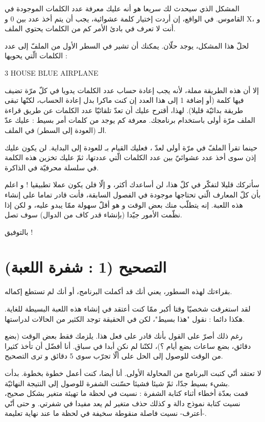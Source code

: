 المشكل الذي سيحدث لك سريعا هو أنه عليك معرفة عدد الكلمات الموجودة في القاموس. في الواقع، إن أردت إختيار كلمة عشوائية، يجب أن يتم أخذ عدد بين 0 و
\textenglish{X}،
و أنت لا تعرف في بادئ الأمر كم من الكلمات يحتوي الملف.

لحلّ هذا المشكل، يوجد حلّان. يمكنك أن تشير في السطر الأول من الملفّ إلى عدد الكلمات الّتي يحويها :

\begin{Console}
3
HOUSE
BLUE
AIRPLANE
\end{Console}

إلا أن هذه الطريقة مملة، لأنه يجب إعادة حساب عدد الكلمات يدويا في كلّ مرّة تضيف فيها كلمة (أو إضافة 1 إلى هذا العدد إن كنت ماكرا بدل إعادة الحساب، لكنّها تبقى طريقة بدائيّة قليلا). لهذا، أقترح عليك أن تعدّ تلقائيّا عدد الكلمات عن طريق قراءة الملف مرّة أولى باستخدام برنامجك. معرفة كم يوجد من كلمات أمر بسيط : عليك عدّ الـ
(العودة إلى السطر) في الملف.

حينما تقرأ الملفّ في مرّة أولى لعدّ
،
فعليك القيام بـ
للعودة إلى البداية. لن يكون عليك إذن سوى أخذ عدد عشوائيّ بين عدد الكلمات الّتي عددتها، ثمّ عليك تخزين هذه الكلمة في سلسلة محرفيّة في الذاكرة.

سأتركك قليلا لتفكّر في كلّ هذا، لن أساعدك أكثر، و إلّا فلن يكون عملا تطبيقيا ! و اعلم بأن  كلّ المعارف الّتي تحتاجها موجودة في الفصول السابقة، فأنت قادر تماما على إنشاء هذه اللعبة. إنه يتطلّب منك بعض الوقت و هو أقلّ سهولة ممّا يبدو عليه، و لكن إذا نظّمت الأمور جيّدا (بإنشاء قدر كاف من الدوال) سوف تصل.

بالتوفيق !

\section{التصحيح (1 : شفرة اللعبة)}

بقراءتك لهذه السطور، يعني أنك قد أكملت البرنامج، أو أنك لم تستطع إكماله.

لقد استغرقت شخصيّا وقتا أكبر ممّا كنت أعتقد في إنشاء هذه اللعبة البسيطة للغاية. هكذا دائما : نقول "هذا بسيط"، لكن في الحقيقة توجد الكثير من الحالات لدراستها.

رغم ذلك أصرّ على القول بأنك قادر على فعل هذا. يلزمك فقط بعض الوقت (بضع دقائق، بضع ساعات بضع أيام ؟)، لكنّنا لم نكن أبدا في سباق. أنا أفضّل أن تأخذ كثيرا من الوقت للوصول إلى الحل على ألّا تجرّب سوى 5 دقائق و ترى التصحيح.

لا تعتقد أنّي كتبت البرنامج من المحاولة الأولى. أنا أيضا، كنت أعمل خطوة بخطوة. بدأت بشيء بسيط جدّا، ثمّ شيئا فشيئا حسّنت الشفرة للوصول إلى النتيجة النهائيّة.\\
قمت بعدّة أخطاء أثناء كتابة الشفرة : نسيت في لحظة ما تهيئة متغير بشكل صحيح، نسيت كتابة نموذج دالة و كذلك حذف متغير لم يعد مفيدا في شفرتي. و حتى أنّي -أعترف- نسيت فاصلة منقوطة سخيفة في لحظة ما عند نهاية تعليمة.

